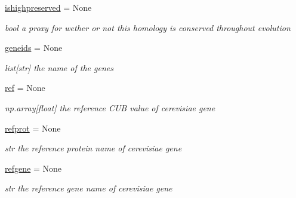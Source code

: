 \begin{DoxyCompactItemize}
\mbox{\label{class_py_c_u_b_1_1homology_1_1homology_af0f123770c60d2444ffb139acaaf5442}} 
\mbox{\hyperlink{class_py_c_u_b_1_1homology_1_1homology_af0f123770c60d2444ffb139acaaf5442}{ishighpreserved}} = None
\begin{DoxyCompactList}\small\item\em bool a proxy for wether or not this homology is conserved throughout evolution \end{DoxyCompactList}\item 
\mbox{\label{class_py_c_u_b_1_1homology_1_1homology_add9343a07f66053ea6ee9dd5ebc275dc}} 
\mbox{\hyperlink{class_py_c_u_b_1_1homology_1_1homology_add9343a07f66053ea6ee9dd5ebc275dc}{geneids}} = None
\begin{DoxyCompactList}\small\item\em list\mbox{[}str\mbox{]} the name of the genes \end{DoxyCompactList}\item 
\mbox{\label{class_py_c_u_b_1_1homology_1_1homology_aa710cdd07ec15477bb995f17f14f0ac5}} 
\mbox{\hyperlink{class_py_c_u_b_1_1homology_1_1homology_aa710cdd07ec15477bb995f17f14f0ac5}{ref}} = None
\begin{DoxyCompactList}\small\item\em np.\+array\mbox{[}float\mbox{]} the reference C\+UB value of cerevisiae gene \end{DoxyCompactList}\item 
\mbox{\label{class_py_c_u_b_1_1homology_1_1homology_a3aeac1174f5e74f3291d35bfbeb0ae56}} 
\mbox{\hyperlink{class_py_c_u_b_1_1homology_1_1homology_a3aeac1174f5e74f3291d35bfbeb0ae56}{refprot}} = None
\begin{DoxyCompactList}\small\item\em str the reference protein name of cerevisiae gene \end{DoxyCompactList}\item 
\mbox{\label{class_py_c_u_b_1_1homology_1_1homology_a549fd390f70453a9676ee4d26c84fe04}} 
\mbox{\hyperlink{class_py_c_u_b_1_1homology_1_1homology_a549fd390f70453a9676ee4d26c84fe04}{refgene}} = None
\begin{DoxyCompactList}\small\item\em str the reference gene name of cerevisiae gene \end{DoxyCompactList}\item 

\end{DoxyCompactItemize}
